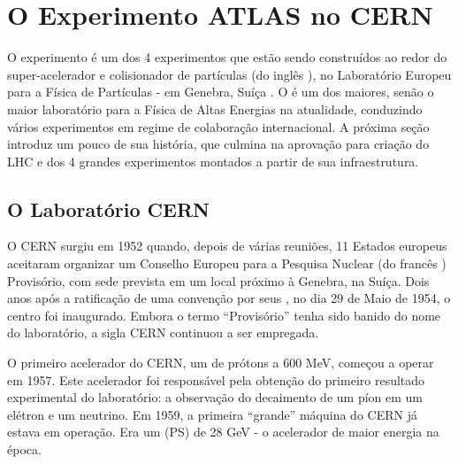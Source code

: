 \typeout{ ====================================================================}
\typeout{ ====================================================================}

\chapter{O Experimento ATLAS no CERN}
\label{chap:atlas}


O experimento  é um dos 4 experimentos que estão sendo construídos
ao redor do super-acelerador e colisionador de partículas  (do inglês
), no Laboratório Europeu para a Física de
Partículas -  em Genebra, Suíça \cite{atlas-tp}. O  é um
dos maiores, senão o maior laboratório para a Física de Altas Energias na
atualidade, conduzindo vários experimentos em regime de colaboração
internacional. A próxima seção introduz um pouco de sua história, que culmina
na aprovação para criação do LHC e dos 4 grandes experimentos montados a
partir de sua infraestrutura.

\section{O Laboratório CERN}

O CERN surgiu em 1952 quando, depois de várias reuniões, 11 Estados europeus
aceitaram organizar um Conselho Europeu para a Pesquisa Nuclear (do francês
) Provisório, com sede
prevista em um local próximo à Genebra, na Suíça. Dois anos após a ratificação
de uma convenção por seus , no dia 29 de Maio de 1954, o
centro foi inaugurado. Embora o termo ``Provisório'' tenha sido banido do nome
do laboratório, a sigla CERN continuou a ser empregada.
 
O primeiro acelerador do CERN, um
 de prótons a 600 MeV, começou a operar em
1957. Este acelerador foi responsável pela obtenção do primeiro resultado
experimental do laboratório: a observação do decaimento de um píon em um
elétron e um neutrino. Em 1959, a primeira ``grande'' máquina do CERN já
estava em operação. Era um  (PS) de 28 GeV - o
acelerador de maior energia na época.

